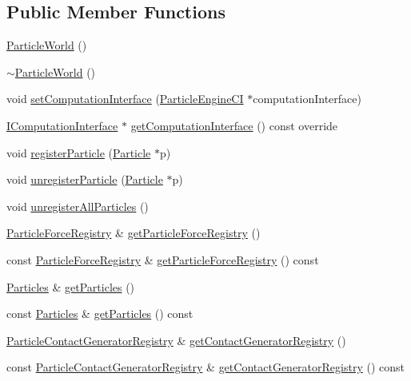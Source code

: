 \subsection*{Public Member Functions}
\begin{DoxyCompactItemize}
\item 
\mbox{\hyperlink{classrum_1_1_particle_world_a0d7219eaf6dd890981944e884e906390}{Particle\+World}} ()
\item 
\mbox{\hyperlink{classrum_1_1_particle_world_a8aaca4550e9469cd4a363fedee6ed75c}{$\sim$\+Particle\+World}} ()
\item 
void \mbox{\hyperlink{classrum_1_1_particle_world_ad6611812d2b85c3eadd3ef163a2c6d3b}{set\+Computation\+Interface}} (\mbox{\hyperlink{classrum_1_1_particle_engine_c_i}{Particle\+Engine\+CI}} $\ast$computation\+Interface)
\item 
\mbox{\hyperlink{classrum_1_1_i_computation_interface}{I\+Computation\+Interface}} $\ast$ \mbox{\hyperlink{classrum_1_1_particle_world_aceee885d3fbc9394d2f05abfcd38c099}{get\+Computation\+Interface}} () const override
\item 
void \mbox{\hyperlink{classrum_1_1_particle_world_aec93898b7eeccc3600be4ad23efe86cd}{register\+Particle}} (\mbox{\hyperlink{classrum_1_1_particle}{Particle}} $\ast$p)
\item 
void \mbox{\hyperlink{classrum_1_1_particle_world_a7d8603a33bd5b2eb5120e45d9322ba4d}{unregister\+Particle}} (\mbox{\hyperlink{classrum_1_1_particle}{Particle}} $\ast$p)
\item 
void \mbox{\hyperlink{classrum_1_1_particle_world_aca9832a894b60a88f9fa506cbf6903e9}{unregister\+All\+Particles}} ()
\item 
\mbox{\hyperlink{classrum_1_1_particle_force_registry}{Particle\+Force\+Registry}} \& \mbox{\hyperlink{classrum_1_1_particle_world_a4a4bd01d1d53a12c1c8499a25df41a1d}{get\+Particle\+Force\+Registry}} ()
\item 
const \mbox{\hyperlink{classrum_1_1_particle_force_registry}{Particle\+Force\+Registry}} \& \mbox{\hyperlink{classrum_1_1_particle_world_ac71f7b09a54a7148027f4a57dc23c7b4}{get\+Particle\+Force\+Registry}} () const
\item 
\mbox{\hyperlink{classrum_1_1_particle_world_ac172daef7c571097de59488881afa300}{Particles}} \& \mbox{\hyperlink{classrum_1_1_particle_world_ae14b992d5ae20001404b54dae72c59b9}{get\+Particles}} ()
\item 
const \mbox{\hyperlink{classrum_1_1_particle_world_ac172daef7c571097de59488881afa300}{Particles}} \& \mbox{\hyperlink{classrum_1_1_particle_world_a93b1798a5462e2b0a4da3ea559d5ed1d}{get\+Particles}} () const
\item 
\mbox{\hyperlink{classrum_1_1_particle_contact_generator_registry}{Particle\+Contact\+Generator\+Registry}} \& \mbox{\hyperlink{classrum_1_1_particle_world_a2ad15a4973ecfda6fdd0678d01f5b634}{get\+Contact\+Generator\+Registry}} ()
\item 
const \mbox{\hyperlink{classrum_1_1_particle_contact_generator_registry}{Particle\+Contact\+Generator\+Registry}} \& \mbox{\hyperlink{classrum_1_1_particle_world_a33326504cce2123d29b1aa6f333f01c9}{get\+Contact\+Generator\+Registry}} () const
\end{DoxyCompactItemize}
